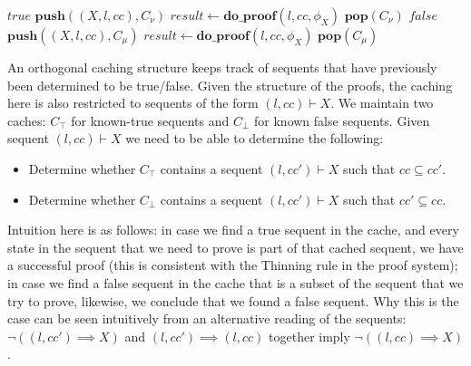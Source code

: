 \documentclass{article}
\newcommand{\loc}{l}
\newcommand{\region}{\mathit{cc}}
\newcommand{\var}[1]{\ensuremath{\mathit{#1}}}
\newcommand{\method}[1]{\ensuremath{\mathbf{#1}}}
\begin{document}
\begin{algorithm}[H]
  \caption{$\method{do\_proof\_predicate}(\loc, \region, \phi)$}
  \begin{algorithmic}
  \STATE {}
  \STATE {}
  
    \IF{$\exists (X, \loc, \region') \in C_\nu . \region \subseteq \region'$}
      \RETURN $\mathit{true}$
    \ELSE
      \STATE $\method{push}((X, \loc, \region), C_\nu)$
      \STATE $\var{result} \gets \method{do\_proof}(\loc, \region, \phi_X)$
      \STATE $\method{pop}(C_\nu)$
    \ENDIF
  \ELSE[Parity of $X$ is $\mu$]
    \IF{$\exists (X, \loc, \region') \in C_\mu . \region' \subseteq \region$}
      \RETURN $\mathit{false}$
    \ELSE
      \STATE $\method{push}((X, \loc, \region), C_\mu)$
      \STATE $\var{result} \gets \method{do\_proof}(\loc, \region, \phi_X)$
      \STATE $\method{pop}(C_\mu)$
    \ENDIF
  \ENDIF
\end{algorithmic}
\end{algorithm}

An orthogonal caching structure keeps track of sequents that have previously been determined to be true/false. Given the structure of the proofs, the caching here is also restricted to sequents of the form $(\loc, \region) \vdash X$. We maintain two caches: $C_\top$ for known-true sequents and $C_\bot$ for known false sequents.
Given sequent $(\loc, \region) \vdash X$ we need to be able to determine the following:
\begin{itemize}
  \item Determine whether $C_\top$ contains a sequent $(\loc, \region') \vdash X$ such that $\region \subseteq \region'$.
  \item Determine whether $C_\bot$ contains a sequent $(\loc, \region') \vdash X$ such that $\region' \subseteq \region$.
\end{itemize}
Intuition here is as follows: in case we find a true sequent in the cache, and every state in the sequent that we need to prove is part of that cached sequent, we have a successful proof (this is consistent with the Thinning rule in the proof system); in case we find a false sequent in the cache that is a subset of the sequent that we try to prove, likewise, we conclude that we found a false sequent. Why this is the case can be seen intuitively from an alternative reading of the sequents: $\lnot((\loc, \region') \implies X)$ and $(\loc, \region') \implies (\loc, \region)$ together imply $\lnot((\loc, \region) \implies X)$.
\end{document}
